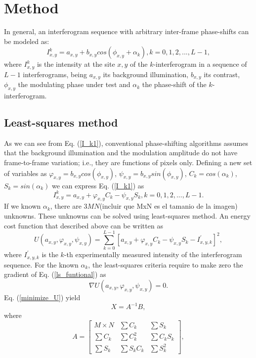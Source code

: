 \documentclass[letterpaper,12pt]{article}   %
\begin{document}
\section{Method}

In general, an interferogram sequence with arbitrary inter-frame phase-shifts can be modeled as: 
\begin{equation}\label{I_k1}
I_{x,y}^k=a_{x,y}+b_{x,y}cos(\phi_{x,y}+\alpha_k), k=0,1,2,...,L-1,
\end{equation}
where $I_{x,y}^k$ is the intensity at the site $x,y$ of the $k$-interferogram in a sequence of $L-1$ interferograms, being $a_{x,y}$ its background illumination, $b_{x,y}$ its contrast, $\phi_{x,y}$ the modulating phase under test and $\alpha_k$ the phase-shift of the $k$-interferogram. 
\subsection{Least-squares method}
As we can see from Eq. (\ref{I_k1}), conventional phase-shifting algorithms assumes that the background illumination and the modulation amplitude do not have frame-to-frame variation; i.e., they are functions of pixels only. Defining a new set of variables as $\varphi_{x,y}=b_{x,y}cos(\phi_{x,y})$, $\psi_{x,y}=b_{x,y}sin(\phi_{x,y})$, $C_k=cos(\alpha_k)$, $S_k=sin(\alpha_k)$ we can express Eq. (\ref{I_k1}) as
\begin{equation}\label{I_k2}
I_{x,y}^k=a_{x,y}+\varphi_{x,y}C_k-\psi_{x,y}S_k, k=0,1,2,...,L-1.
\end{equation}
If we known $\alpha_k$, there are $3MN$(incluir que MxN es el tamanio de la imagen) unknowns. These unknowns can be solved using least-squares method. An energy cost function that described above can be written as
\begin{equation}\label{ls_funtional}
U(a_{x,y},\varphi_{x,y},\psi_{x,y})=\sum_{k=0}^{L-1} [a_{x,y}+\varphi_{x,y}C_k-\psi_{x,y}S_k-I_{x,y,k}^{'}]^2,
\end{equation}
where $I_{x,y,k}^{'}$ is the $k$-th experimentally measured intensity of the interferogram sequence. For the known $\alpha_k$, the least-squares criteria require to make zero the gradient of Eq. (\ref{ls_funtional}) as
\begin{equation}\label{minimize_U}
\nabla U(a_{x,y},\varphi_{x,y},\psi_{x,y})=0.
\end{equation}
Eq. (\ref{minimize_U}) yield
\begin{equation}\label{x=AB}
X = A^{-1} B,
\end{equation}
where
\begin{equation}\label{A}
A = \left[ \begin{array}{ccc}
M\times N & \sum C_k     & \sum S_k \\
\sum C_k  & \sum C_k^2   & \sum C_k S_k \\
\sum S_k  & \sum S_k C_k & \sum S_k^2\end{array} \right],
\end{equation}
\end{document}
